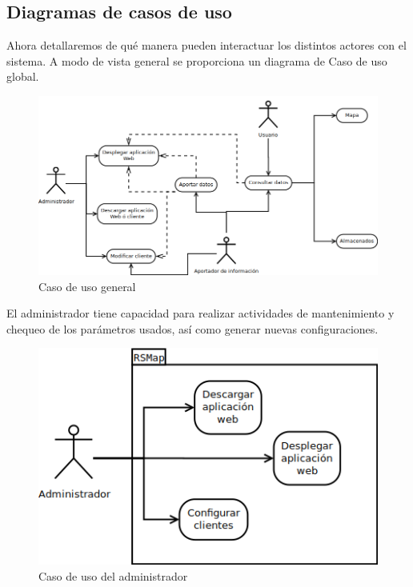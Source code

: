 \newpage

\subsection{Diagramas de casos de uso}

Ahora detallaremos de qué manera pueden interactuar los distintos actores con el sistema. A modo de vista general se proporciona un diagrama de Caso de uso global.

\begin{figure}[!ht]
  \begin{center}
    \includegraphics[scale=0.45]{../images/diag_plan/cu_gen.png}
    \caption{Caso de uso general}
    \label{fig:cu_admin}
  \end{center}
\end{figure}



El administrador tiene capacidad para realizar actividades de mantenimiento y chequeo de los parámetros usados, así como generar nuevas configuraciones.
\begin{figure}[!ht]
  \begin{center}
    \includegraphics[scale=0.45]{../images/diag_plan/cu_admin.png}
    \caption{Caso de uso del administrador}
    \label{fig:cu_admin}
  \end{center}
\end{figure}

